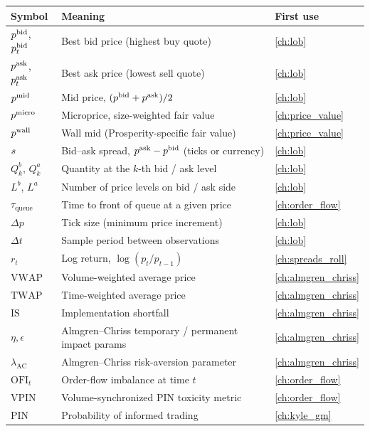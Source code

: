 \begin{longtable}{@{}l >{\raggedright\arraybackslash}p{} l@{}}
\toprule
\textbf{Symbol} & \textbf{Meaning} & \textbf{First use} \\
\midrule
\endhead
$p^{\mathrm{bid}}$, $p^{\mathrm{bid}}_t$ & Best bid price (highest buy quote) & \cref{ch:lob} \\
$p^{\mathrm{ask}}$, $p^{\mathrm{ask}}_t$ & Best ask price (lowest sell quote) & \cref{ch:lob} \\
$p^{\mathrm{mid}}$ & Mid price, $(p^{\mathrm{bid}}+p^{\mathrm{ask}})/2$ & \cref{ch:lob} \\
$p^{\mathrm{micro}}$ & Microprice, size-weighted fair value & \cref{ch:price_value} \\
$p^{\mathrm{wall}}$ & Wall mid (Prosperity-specific fair value) & \cref{ch:price_value} \\
$s$ & Bid--ask spread, $p^{\mathrm{ask}}-p^{\mathrm{bid}}$ (ticks or currency) & \cref{ch:lob} \\
$Q^b_k$, $Q^a_k$ & Quantity at the $k$-th bid / ask level & \cref{ch:lob} \\
$L^b$, $L^a$ & Number of price levels on bid / ask side & \cref{ch:lob} \\
$\tau_{\text{queue}}$ & Time to front of queue at a given price & \cref{ch:order_flow} \\
$\Delta p$ & Tick size (minimum price increment) & \cref{ch:lob} \\
$\Delta t$ & Sample period between observations & \cref{ch:lob} \\
$r_t$ & Log return, $\log(p_t/p_{t-1})$ & \cref{ch:spreads_roll} \\
$\text{VWAP}$ & Volume-weighted average price & \cref{ch:almgren_chriss} \\
$\text{TWAP}$ & Time-weighted average price & \cref{ch:almgren_chriss} \\
$\text{IS}$ & Implementation shortfall & \cref{ch:almgren_chriss} \\
$\eta, \epsilon$ & Almgren--Chriss temporary / permanent impact params & \cref{ch:almgren_chriss} \\
$\lambda_{\text{AC}}$ & Almgren--Chriss risk-aversion parameter & \cref{ch:almgren_chriss} \\
$\text{OFI}_t$ & Order-flow imbalance at time $t$ & \cref{ch:order_flow} \\
$\text{VPIN}$ & Volume-synchronized PIN toxicity metric & \cref{ch:order_flow} \\
$\text{PIN}$ & Probability of informed trading & \cref{ch:kyle_gm} \\
\bottomrule
\end{longtable}

